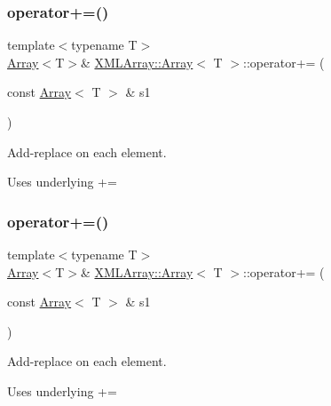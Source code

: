 \subsubsection{\texorpdfstring{operator+=()}{operator+=()}\hspace{0.1cm}{\footnotesize\ttfamily [1/4]}}
{\footnotesize\ttfamily template$<$typename T$>$ \\
\mbox{\hyperlink{classXMLArray_1_1Array}{Array}}$<$T$>$\& \mbox{\hyperlink{classXMLArray_1_1Array}{X\+M\+L\+Array\+::\+Array}}$<$ T $>$\+::operator+= (\begin{DoxyParamCaption}\item[{const \mbox{\hyperlink{classXMLArray_1_1Array}{Array}}$<$ T $>$ \&}]{s1 }\end{DoxyParamCaption})\hspace{0.3cm}{\ttfamily [inline]}}



Add-\/replace on each element. 

Uses underlying += \mbox{\label{classXMLArray_1_1Array_ab8a6046aa7dbc0b3c43e4479b1eaf004}} 
\subsubsection{\texorpdfstring{operator+=()}{operator+=()}\hspace{0.1cm}{\footnotesize\ttfamily [2/4]}}
{\footnotesize\ttfamily template$<$typename T$>$ \\
\mbox{\hyperlink{classXMLArray_1_1Array}{Array}}$<$T$>$\& \mbox{\hyperlink{classXMLArray_1_1Array}{X\+M\+L\+Array\+::\+Array}}$<$ T $>$\+::operator+= (\begin{DoxyParamCaption}\item[{const \mbox{\hyperlink{classXMLArray_1_1Array}{Array}}$<$ T $>$ \&}]{s1 }\end{DoxyParamCaption})\hspace{0.3cm}{\ttfamily [inline]}}



Add-\/replace on each element. 

Uses underlying += \mbox{\label{classXMLArray_1_1Array_ad3487cb84f2a45cc24ed06f5e96a62ee}} 
